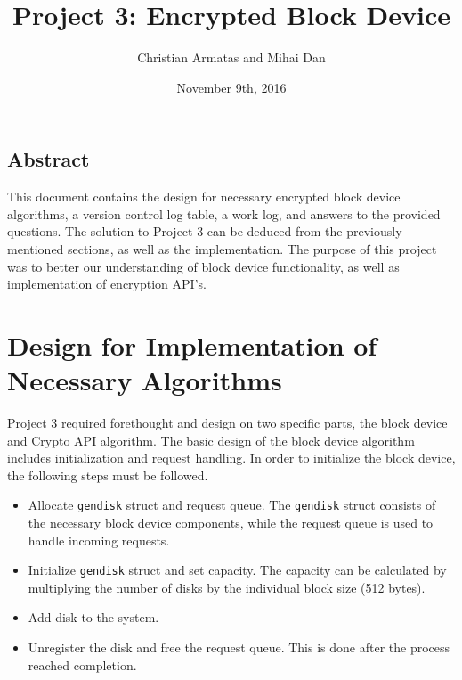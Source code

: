 \documentclass[letterpaper,10pt,onecolumn]{IEEEtran}
\title{Project 3: Encrypted Block Device}
\author{Christian Armatas and Mihai Dan}
\date{November 9th, 2016}
\begin{document}
    \begin{center}
        \begin{minipage}[h]{\textwidth}
            \maketitle
        \end{minipage}
    \end{center}
    
    \vspace{140mm}
    
    \begin{center}
        \section*{Abstract}
        This document contains the design for necessary encrypted block device algorithms, a version control log table, a work log, and answers to the provided questions. The solution to Project 3 can be deduced from the previously mentioned sections, as well as the implementation. The purpose of this project was to better our understanding of block device functionality, as well as implementation of encryption API's.
    \end{center}
    
    
    \newpage
    
    
    \section*{Design for Implementation of Necessary Algorithms}
        Project 3 required forethought and design on two specific parts, the block device and Crypto API algorithm. The basic design of the block device algorithm includes initialization and request handling. In order to initialize the block device, the following steps must be followed.
        \begin{itemize}
            \item Allocate \texttt{gendisk} struct and request queue. The \texttt{gendisk} struct consists of the necessary block device components, while the request queue is used to handle incoming requests.
            \item Initialize \texttt{gendisk} struct and set capacity. The capacity can be calculated by multiplying the number of disks by the individual block size (512 bytes).
            \item Add disk to the system.
            \item Unregister the disk and free the request queue. This is done after the process reached completion.
        \end{itemize}
        
\end{document}
